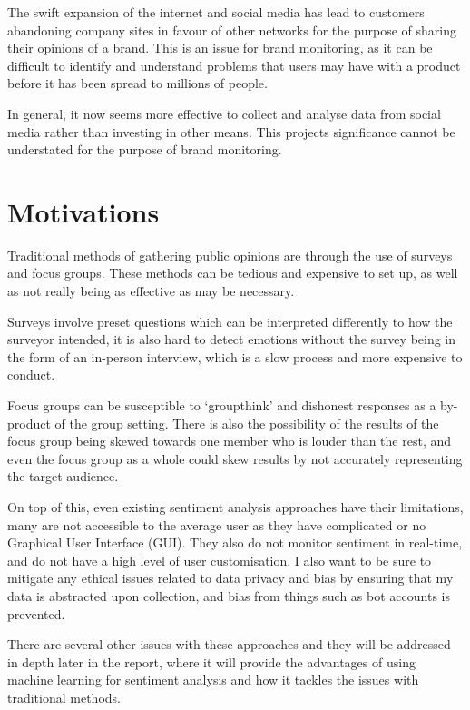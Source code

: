 The swift expansion of the internet and social media has lead to customers abandoning company sites in favour of other networks for the purpose of sharing their opinions of a brand. This is an issue for brand monitoring, as it can be difficult to identify and understand problems that users may have with a product before it has been spread to millions of people.

In general, it now seems more effective to collect and analyse data from social media rather than investing in other means. This projects significance cannot be understated for the purpose of brand monitoring.

\section{Motivations}
Traditional methods of gathering public opinions are through the use of surveys and focus groups. These methods can be tedious and expensive to set up, as well as not really being as effective as may be necessary.

Surveys involve preset questions which can be interpreted differently to how the surveyor intended, it is also hard to detect emotions without the survey being in the form of an in-person interview, which is a slow process and more expensive to conduct. 

Focus groups can be susceptible to `groupthink' and dishonest responses as a by-product of the group setting. There is also the possibility of the results of the focus group being skewed towards one member who is louder than the rest, and even the focus group as a whole could skew results by not accurately representing the target audience.

On top of this, even existing sentiment analysis approaches have their limitations, many are not accessible to the average user as they have complicated or no Graphical User Interface (GUI). They also do not monitor sentiment in real-time, and do not have a high level of user customisation. I also want to be sure to mitigate any ethical issues related to data privacy and bias by ensuring that my data is abstracted upon collection, and bias from things such as bot accounts is prevented.

There are several other issues with these approaches and they will be addressed in depth later in the report, where it will provide the advantages of using machine learning for sentiment analysis and how it tackles the issues with traditional methods.

